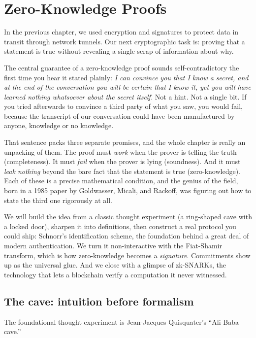 \chapter{Zero-Knowledge Proofs}

In the previous chapter, we used encryption and signatures to protect data in transit through network tunnels. Our next cryptographic task is: proving that a statement is true without revealing a single scrap of information about why.

The central guarantee of a zero-knowledge proof sounds self-contradictory the
first time you hear it stated plainly: \emph{I can convince you that I know a secret, and at the end
of the conversation you will be certain that I know it, yet you will have
learned nothing whatsoever about the secret itself.} Not a hint. Not a single
bit. If you tried afterwards to convince a third party of what you saw, you
would fail, because the transcript of our conversation could have been
manufactured by anyone, knowledge or no knowledge.

That sentence packs three separate promises, and the whole chapter is really an
unpacking of them. The proof must \emph{work} when the prover is telling the
truth (completeness). It must \emph{fail} when the prover is lying (soundness).
And it must \emph{leak nothing} beyond the bare fact that the statement is true
(zero-knowledge). Each of these is a precise mathematical condition, and the
genius of the field, born in a 1985 paper by Goldwasser, Micali, and Rackoff,
was figuring out how to state the third one rigorously at all.

We will build the idea from a classic thought experiment (a ring-shaped cave with a locked door), sharpen it
into definitions, then construct a real protocol you could ship: Schnorr's
identification scheme, the foundation behind a great deal of modern
authentication. We turn it non-interactive with the Fiat-Shamir transform,
which is how zero-knowledge becomes a \emph{signature}. Commitments show up as
the universal glue. And we close with a glimpse of zk-SNARKs, the technology
that lets a blockchain verify a computation it never witnessed.

\chapterline

\section{The cave: intuition before formalism}
\label{ch31:cave}

The foundational thought experiment is Jean-Jacques Quisquater's ``Ali Baba cave.''


